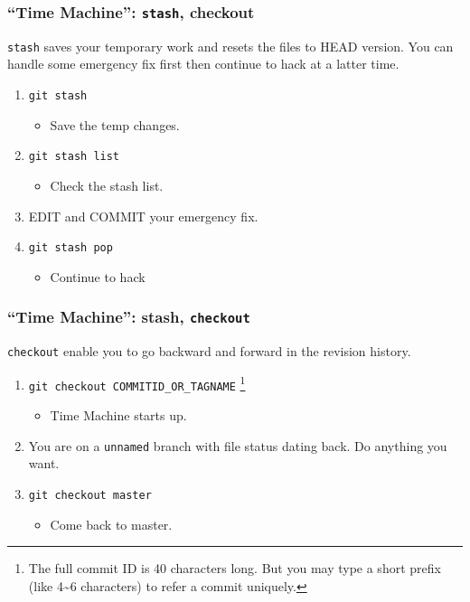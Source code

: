 \documentclass[11pt,ignorenonframetext,]{beamer}
\begin{document}
\begin{frame}[fragile, label=gittime]\frametitle{``Time Machine'': \texttt{stash},
checkout}

\texttt{stash} saves your temporary work and resets the files to HEAD
version. You can handle some emergency fix first then continue to hack
at a latter time.

\begin{enumerate}[1.]
\item
  \texttt{git stash}
  \begin{itemize}
  \item
    Save the temp changes.
  \end{itemize}
\item
  \texttt{git stash list}
  \begin{itemize}
  \item
    Check the stash list.
  \end{itemize}
\item
  EDIT and COMMIT your emergency fix.
\item
  \texttt{git stash pop}
  \begin{itemize}
  \item
    Continue to hack
  \end{itemize}
\end{enumerate}
\end{frame}

\begin{frame}[fragile]\frametitle{``Time Machine'': stash,
\texttt{checkout}}

\texttt{checkout} enable you to go backward and forward in the revision
history.

\begin{enumerate}[1.]
\item
  \texttt{git checkout COMMITID\_OR\_TAGNAME} \footnote{The full commit
    ID is 40 characters long. But you may type a short prefix (like
    4\textasciitilde{}6 characters) to refer a commit uniquely.}
  \begin{itemize}
  \item
    Time Machine starts up.
  \end{itemize}
\item
  You are on a \texttt{unnamed} branch with file status dating back. Do
  anything you want.
\item
  \texttt{git checkout master}
  \begin{itemize}
  \item
    Come back to master.
  \end{itemize}
\end{enumerate}
\end{frame}
\end{document}
